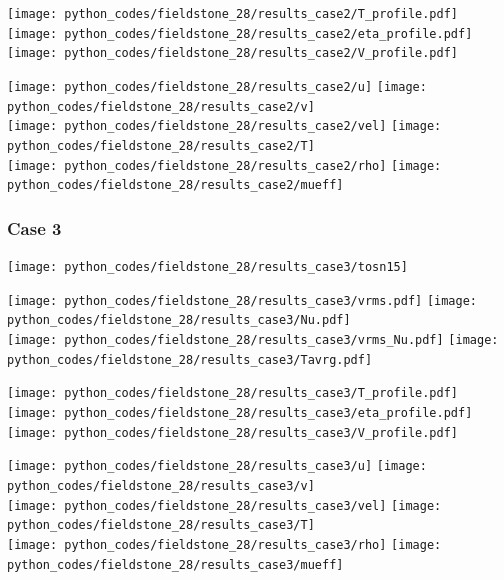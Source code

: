 \begin{center}
\texttt{[image: python\_codes/fieldstone\_28/results\_case2/T\_profile.pdf]}
\texttt{[image: python\_codes/fieldstone\_28/results\_case2/eta\_profile.pdf]}
\texttt{[image: python\_codes/fieldstone\_28/results\_case2/V\_profile.pdf]}
\end{center}

\newpage
\begin{center}
\texttt{[image: python\_codes/fieldstone\_28/results\_case2/u]}
\texttt{[image: python\_codes/fieldstone\_28/results\_case2/v]}\\
\texttt{[image: python\_codes/fieldstone\_28/results\_case2/vel]}
\texttt{[image: python\_codes/fieldstone\_28/results\_case2/T]}\\
\texttt{[image: python\_codes/fieldstone\_28/results\_case2/rho]}
\texttt{[image: python\_codes/fieldstone\_28/results\_case2/mueff]}
\end{center}




\newpage %
\subsubsection*{Case 3}

\texttt{[image: python\_codes/fieldstone\_28/results\_case3/tosn15]}

\begin{center}
\texttt{[image: python\_codes/fieldstone\_28/results\_case3/vrms.pdf]}
\texttt{[image: python\_codes/fieldstone\_28/results\_case3/Nu.pdf]}\\
\texttt{[image: python\_codes/fieldstone\_28/results\_case3/vrms\_Nu.pdf]}
\texttt{[image: python\_codes/fieldstone\_28/results\_case3/Tavrg.pdf]}
\end{center}

\begin{center}
\texttt{[image: python\_codes/fieldstone\_28/results\_case3/T\_profile.pdf]}
\texttt{[image: python\_codes/fieldstone\_28/results\_case3/eta\_profile.pdf]}
\texttt{[image: python\_codes/fieldstone\_28/results\_case3/V\_profile.pdf]}
\end{center}

\newpage
\begin{center}
\texttt{[image: python\_codes/fieldstone\_28/results\_case3/u]}
\texttt{[image: python\_codes/fieldstone\_28/results\_case3/v]}\\
\texttt{[image: python\_codes/fieldstone\_28/results\_case3/vel]}
\texttt{[image: python\_codes/fieldstone\_28/results\_case3/T]}\\
\texttt{[image: python\_codes/fieldstone\_28/results\_case3/rho]}
\texttt{[image: python\_codes/fieldstone\_28/results\_case3/mueff]}
\end{center}




